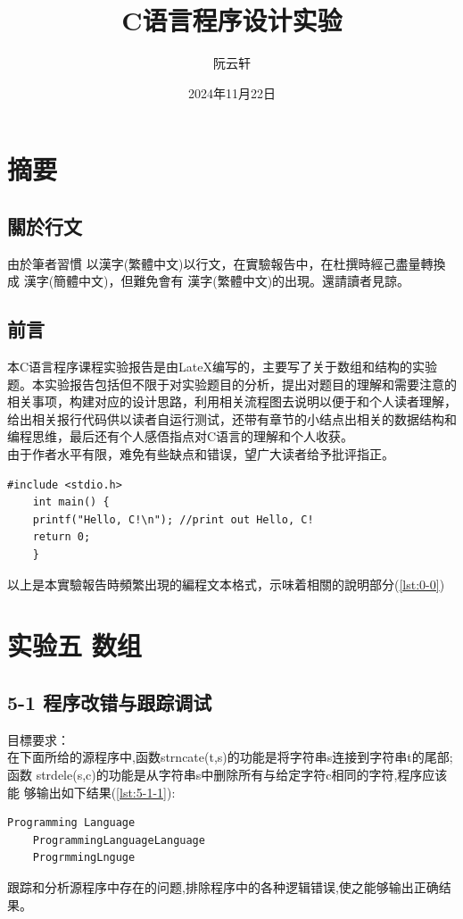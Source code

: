 \documentclass[supercite]{Experimental_Report}
\title{~~~~~~C语言程序设计实验~~~~~~}
\author{阮云轩}
\date{2024年11月22日}
\theoremstyle{definition}
\begin{document}
	
	\maketitle
	
	\clearpage
	
	
	\tableofcontents[level=2]
	
	\clearpage
	
	
	\listoflistings
	\section{摘要}
	
	\subsection{關於行文}
	由於筆者習慣 以漢字(繁體中文)以行文，在實驗報告中，在杜撰時經己盡量轉換成 漢字(簡體中文)，但難免會有 漢字(繁體中文)的出現。還請讀者見諒。
	\subsection{前言}
	本C语言程序课程实验报告是由LateX编写的，主要写了关于数组和结构的实验题。本实验报告包括但不限于对实验题目的分析，提出对题目的理解和需要注意的相关事项，构建对应的设计思路，利用相关流程图去说明以便于和个人读者理解，给出相关报行代码供以读者自运行测试，还带有章节的小结点出相关的数据结构和编程思维，最后还有个人感俉指点对C语言的理解和个人收获。
	\\由于作者水平有限，难免有些缺点和错误，望广大读者给予批评指正。

\begin{lstlisting}[style=commonCodeStyle, caption={示例}, label={lst:0-0}]
	#include <stdio.h>
	int main() {
	printf("Hello, C!\n"); //print out Hello, C!
	return 0;
	}
\end{lstlisting}
以上是本實驗報告時頻繁出現的編程文本格式，示味着相關的說明部分(\ref{lst:0-0})
	
	\section{实验五 数组}
		\subsection{5-1 程序改错与跟踪调试}
		
		目標要求：\\
		在下面所给的源程序中,函数strncate(t,s)的功能是将字符串s连接到字符串t的尾部; 函数 strdele(s,c)的功能是从字符串s中删除所有与给定字符c相同的字符,程序应该能
		够输出如下结果(\ref{lst:5-1-1}):
\begin{lstlisting}[style=commonCodeStyle, caption={示例}, label={lst:5-1-1}]
	Programming Language
	ProgrammingLanguageLanguage 
	ProgrmmingLnguge
\end{lstlisting}
		跟踪和分析源程序中存在的问题,排除程序中的各种逻辑错误,使之能够输出正确结果。
\end{document}
